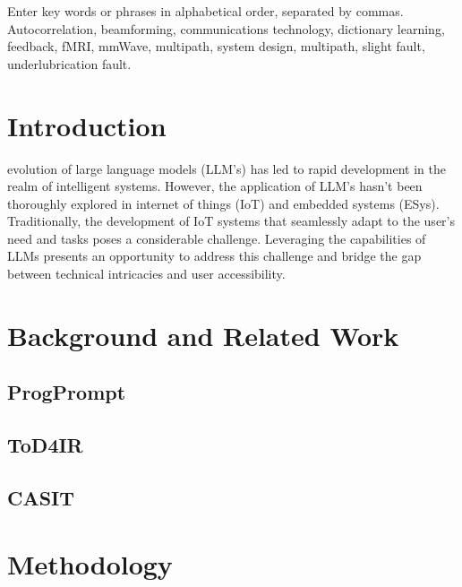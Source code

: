 \documentclass{ieeeaccess}
\begin{document}
\begin{keywords}
    Enter key words or phrases in alphabetical
    order, separated by commas. Autocorrelation, beamforming, communications
    technology, dictionary learning, feedback, fMRI, mmWave, multipath, system
    design, multipath, slight fault, underlubrication fault.
\end{keywords}

\titlepgskip=-21pt

\maketitle

\section{Introduction}
\label{sec:introduction}
 evolution of large language models (LLM's) has led to rapid
development in the  realm of intelligent systems. However, the application of
LLM's hasn't been thoroughly explored in internet of things (IoT) and embedded
systems (ESys). Traditionally, the development of IoT systems that seamlessly
adapt to the user's need and tasks poses a considerable challenge. Leveraging
the capabilities of LLMs presents an opportunity to address this challenge and
bridge the gap between technical intricacies and user accessibility.
\section{Background and Related Work}

\subsection{ProgPrompt}
\subsection{ToD4IR}
\subsection{CASIT}


\section{Methodology}
\end{document}
